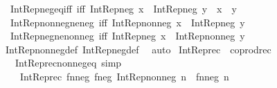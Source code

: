 \begin{isabellebody}
\ \ Int{\isacharunderscore}{\kern0pt}Rep{\isacharunderscore}{\kern0pt}neg{\isacharunderscore}{\kern0pt}eq{\isacharunderscore}{\kern0pt}iff\ {\isacharbrackleft}{\kern0pt}iff{\isacharbrackright}{\kern0pt}{\isacharcolon}{\kern0pt}\ {\isachardoublequoteopen}Int{\isacharunderscore}{\kern0pt}Rep{\isacharunderscore}{\kern0pt}neg\ x\ {\isacharequal}{\kern0pt}\ Int{\isacharunderscore}{\kern0pt}Rep{\isacharunderscore}{\kern0pt}neg\ y\ {\isasymlongleftrightarrow}\ x\ {\isacharequal}{\kern0pt}\ y{\isachardoublequoteclose}\ \isanewline
\ \ Int{\isacharunderscore}{\kern0pt}Rep{\isacharunderscore}{\kern0pt}nonneg{\isacharunderscore}{\kern0pt}ne{\isacharunderscore}{\kern0pt}neg\ {\isacharbrackleft}{\kern0pt}iff{\isacharbrackright}{\kern0pt}{\isacharcolon}{\kern0pt}\ {\isachardoublequoteopen}Int{\isacharunderscore}{\kern0pt}Rep{\isacharunderscore}{\kern0pt}nonneg\ x\ {\isasymnoteq}\ Int{\isacharunderscore}{\kern0pt}Rep{\isacharunderscore}{\kern0pt}neg\ y{\isachardoublequoteclose}\ \isanewline
\ \ Int{\isacharunderscore}{\kern0pt}Rep{\isacharunderscore}{\kern0pt}neg{\isacharunderscore}{\kern0pt}ne{\isacharunderscore}{\kern0pt}nonneg\ {\isacharbrackleft}{\kern0pt}iff{\isacharbrackright}{\kern0pt}{\isacharcolon}{\kern0pt}\ {\isachardoublequoteopen}Int{\isacharunderscore}{\kern0pt}Rep{\isacharunderscore}{\kern0pt}neg\ x\ {\isasymnoteq}\ Int{\isacharunderscore}{\kern0pt}Rep{\isacharunderscore}{\kern0pt}nonneg\ y{\isachardoublequoteclose}\isanewline
%
\isadelimproof
\ \ %
\endisadelimproof
%
\isatagproof
{}\isamarkupfalse%
\ Int{\isacharunderscore}{\kern0pt}Rep{\isacharunderscore}{\kern0pt}nonneg{\isacharunderscore}{\kern0pt}def\ Int{\isacharunderscore}{\kern0pt}Rep{\isacharunderscore}{\kern0pt}neg{\isacharunderscore}{\kern0pt}def\ \isamarkupfalse%
\ auto%
\endisatagproof
{\isafoldproof}%
%
\isadelimproof
\isanewline
%
\endisadelimproof
\isanewline
{}\isamarkupfalse%
\ {\isachardoublequoteopen}Int{\isacharunderscore}{\kern0pt}Rep{\isacharunderscore}{\kern0pt}rec\ {\isasymequiv}\ coprod{\isacharunderscore}{\kern0pt}rec{\isachardoublequoteclose}\isanewline
\isanewline
{}\isamarkupfalse%
\isanewline
\ \ \ Int{\isacharunderscore}{\kern0pt}Rep{\isacharunderscore}{\kern0pt}rec{\isacharunderscore}{\kern0pt}nonneg{\isacharunderscore}{\kern0pt}eq\ {\isacharbrackleft}{\kern0pt}simp{\isacharbrackright}{\kern0pt}{\isacharcolon}{\kern0pt}\isanewline
\ \ \ \ {\isachardoublequoteopen}Int{\isacharunderscore}{\kern0pt}Rep{\isacharunderscore}{\kern0pt}rec\ f{\isacharunderscore}{\kern0pt}nneg\ f{\isacharunderscore}{\kern0pt}neg\ {\isacharparenleft}{\kern0pt}Int{\isacharunderscore}{\kern0pt}Rep{\isacharunderscore}{\kern0pt}nonneg\ n{\isacharparenright}{\kern0pt}\ {\isacharequal}{\kern0pt}\ f{\isacharunderscore}{\kern0pt}nneg\ n{\isachardoublequoteclose}\isanewline

\end{isabellebody}
